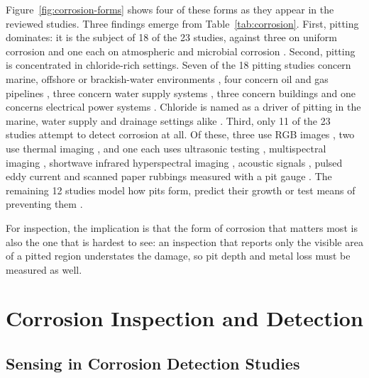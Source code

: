 Figure~\ref{fig:corrosion-forms} shows four of these forms as they appear in the
reviewed studies. Three findings emerge from Table~\ref{tab:corrosion}. First, pitting dominates:
it is the subject of 18 of the 23 studies, against three on uniform corrosion
\citep{Khodabux2020,Yang2025,Yang2026a} and one each on atmospheric \citep{DeKerf2022} and microbial corrosion \citep{Liang2021}.
Second, pitting is concentrated in chloride-rich settings. Seven of the 18
pitting studies concern marine, offshore or brackish-water environments
\citep{Liu2026,Wang2021,Khodabux2021,Nugroho2021,Mao2026,Khodabux2021a,Suzuki2026}, four concern oil and gas pipelines
\citep{Akhlaghi2023,Arzaghi2020,Malashin2024,Huang2026a}, three concern water supply systems \citep{Li2022,Nguyen2026,Liu2021}, three concern
buildings \citep{Elizalde2023,Qin2026,Egodawela2025} and one concerns electrical power systems \citep{Wojciechowski2025}.
Chloride is named as a driver of pitting in the marine, water supply and
drainage settings alike \citep{Liu2026,Li2022,Nguyen2026,Suzuki2026,Khodabux2021a}. Third, only 11 of the 23 studies
attempt to detect corrosion at all. Of these, three use RGB images
\citep{Malashin2024,Mao2026,Suzuki2026}, two use thermal imaging \citep{Elizalde2023,Liu2021}, and one each uses ultrasonic
testing \citep{Huang2026a}, multispectral imaging \citep{Egodawela2025}, shortwave infrared
hyperspectral imaging \citep{DeKerf2022}, acoustic signals \citep{Yang2026a}, pulsed eddy current
\citep{Yang2025} and scanned paper rubbings measured with a pit gauge \citep{Khodabux2021a}. The remaining
12 studies model how pits form, predict their growth or test means of preventing
them \citep{Liu2026,Li2022,Nguyen2026,Wang2021,Qin2026,Akhlaghi2023,Wojciechowski2025,Khodabux2020,Liang2021,Khodabux2021,Nugroho2021,Arzaghi2020}.

For inspection, the implication is that the form of corrosion that matters most
is also the one that is hardest to see: an inspection that reports only the
visible area of a pitted region understates the damage, so pit depth and metal
loss must be measured as well.

\section{Corrosion Inspection and Detection}
\label{sec:lr-corrosion-detection}

\subsection{Sensing in Corrosion Detection Studies}

